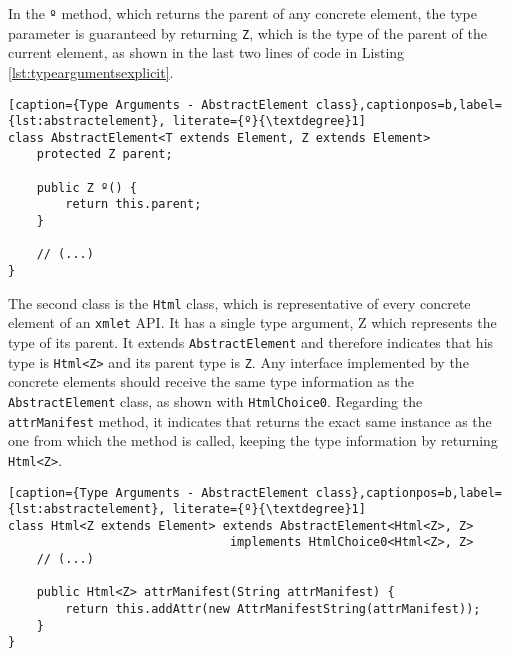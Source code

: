 
\noindent
In the \texttt{º} method, which returns the parent of any concrete element, the type parameter is guaranteed by returning \texttt{Z}, which is the type of the parent of the current element, as shown in the last two lines of code in Listing \ref{lst:typeargumentsexplicit}.

\bigskip

\begin{minipage}{\linewidth}
\begin{lstlisting}[caption={Type Arguments - AbstractElement class},captionpos=b,label={lst:abstractelement}, literate={º}{\textdegree}1]
class AbstractElement<T extends Element, Z extends Element>
	protected Z parent;
	
	public Z º() {
		return this.parent;
	}
	
	// (...)
}
\end{lstlisting}
\end{minipage}

\noindent
The second class is the \texttt{Html} class, which is representative of every concrete element of an \texttt{xmlet} \ac{API}. It has a single type argument, Z which represents the type of its parent. It extends \texttt{AbstractElement} and therefore indicates that his type is \texttt{Html<Z>} and its parent type is \texttt{Z}. Any  interface implemented by the concrete elements should receive the same type information as the \texttt{AbstractElement} class, as shown with \texttt{HtmlChoice0}. Regarding the \texttt{attrManifest} method, it indicates that returns the exact same instance as the one from which the method is called, keeping the type information by returning \texttt{Html<Z>}.

\bigskip


\begin{minipage}{\linewidth}
\begin{lstlisting}[caption={Type Arguments - AbstractElement class},captionpos=b,label={lst:abstractelement}, literate={º}{\textdegree}1]
class Html<Z extends Element> extends AbstractElement<Html<Z>, Z>
                               implements HtmlChoice0<Html<Z>, Z>
    // (...)
    
    public Html<Z> attrManifest(String attrManifest) {
        return this.addAttr(new AttrManifestString(attrManifest));
    }
}
\end{lstlisting}
\end{minipage}

